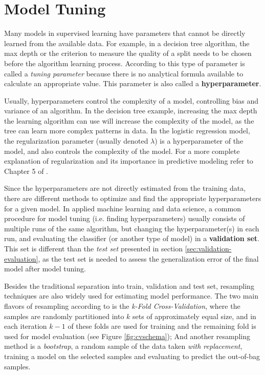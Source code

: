 \section{Model Tuning}

Many models in supervised learning have parameters that cannot be directly learned from the available data. For example, in a decision tree algorithm, the max depth or the criterion to measure the quality of a split needs to be chosen before the algorithm learning process. According to \cite{kuhn2013applied} this type of parameter is called a \textit{tuning parameter} because there is no analytical formula available to calculate an appropriate value. This parameter is also called a \textbf{hyperparameter}. 

Usually, hyperparameters control the complexity of a model, controlling bias and variance of an algorithm. In the decision tree example, increasing the max depth the learning algorithm can use will increase the complexity of the model, as the tree can learn more complex patterns in data. In the logistic regression model, the regularization parameter (usually denoted $\lambda$) is a hyperparameter of the model, and also controls the complexity of the model. For a more complete explanation of regularization and its importance in predictive modeling refer to Chapter 5 of \cite{hastie2009elements}.

Since the hyperparameters are not directly estimated from the training data, there are different methods to optimize and find the appropriate hyperparameters for a given model. In applied machine learning and data science, a common procedure for model tuning (i.e. finding hyperparameters) usually consists of multiple runs of the same algorithm, but changing the hyperparameter(s) in each run, and evaluating the classifier (or another type of model) in a \textbf{validation set}. This set is different than the \textit{test set} presented in section \ref{sec:validation-evaluation}, as the test set is needed to assess the generalization error of the final model after model tuning. 

Besides the traditional separation into train, validation and test set, resampling techniques are also widely used for estimating model performance. The two main flavors of resampling according to \cite{kuhn2013applied} is the \textit{k-Fold Cross-Validation}, where the samples are randomly partitioned into $k$ sets of approximately equal size, and in each iteration $k - 1$ of these folds are used for training and the remaining fold is used for model evaluation (see Figure \ref{fig:cvschema}); And another resampling method is a \textit{bootstrap}, a random sample of the data taken \textit{with replacement}, training a model on the selected samples and evaluating to predict the out-of-bag samples.

